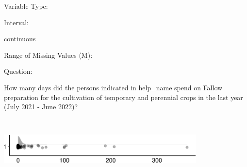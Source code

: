 \documentclass[
]{article}
\begin{document}
\begin{minipage}[t]{0.3\linewidth}

Variable Type:

\end{minipage}%
\begin{minipage}[t]{0.7\linewidth}

\end{minipage}

\begin{minipage}[t]{0.3\linewidth}

Interval:

\end{minipage}%
\begin{minipage}[t]{0.7\linewidth}

continuous

\end{minipage}

\begin{minipage}[t]{0.3\linewidth}

Range of Missing Values (M):

\end{minipage}%
\begin{minipage}[t]{0.7\linewidth}

\end{minipage}

\begin{minipage}[t]{0.3\linewidth}

Question:

\end{minipage}%
\begin{minipage}[t]{0.7\linewidth}

How many days did the persons indicated in help\_name spend on Fallow
preparation for the cultivation of temporary and perennial crops in the
last year (July 2021 - June 2022)?

\end{minipage}

\begin{minipage}[t]{0.3\linewidth}

~

\end{minipage}%
\begin{minipage}[t]{0.7\linewidth}

\includegraphics[width=396px]{codebook_template_files/figure-latex/q7_27_rainplot-1}

\end{minipage}
 \vspace*{-6mm} 
\end{document}
